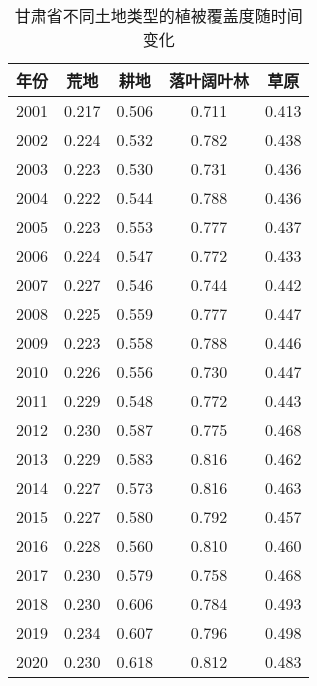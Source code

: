 \documentclass{article}
\begin{document}
		\begin{table}[H]
			\centering
			\begin{tabular}{|c|c|c|c|c|}
				\hline
				\textbf{年份} & \textbf{荒地} & \textbf{耕地} & \textbf{落叶阔叶林} & \textbf{草原} \\
				\hline
				2001 & 0.217 & 0.506 & 0.711 & 0.413 \\
				2002 & 0.224 & 0.532 & 0.782 & 0.438 \\
				2003 & 0.223 & 0.530 & 0.731 & 0.436 \\
				2004 & 0.222 & 0.544 & 0.788 & 0.436 \\
				2005 & 0.223 & 0.553 & 0.777 & 0.437 \\
				2006 & 0.224 & 0.547 & 0.772 & 0.433 \\
				2007 & 0.227 & 0.546 & 0.744 & 0.442 \\
				2008 & 0.225 & 0.559 & 0.777 & 0.447 \\
				2009 & 0.223 & 0.558 & 0.788 & 0.446 \\
				2010 & 0.226 & 0.556 & 0.730 & 0.447 \\
				2011 & 0.229 & 0.548 & 0.772 & 0.443 \\
				2012 & 0.230 & 0.587 & 0.775 & 0.468 \\
				2013 & 0.229 & 0.583 & 0.816 & 0.462 \\
				2014 & 0.227 & 0.573 & 0.816 & 0.463 \\
				2015 & 0.227 & 0.580 & 0.792 & 0.457 \\
				2016 & 0.228 & 0.560 & 0.810 & 0.460 \\
				2017 & 0.230 & 0.579 & 0.758 & 0.468 \\
				2018 & 0.230 & 0.606 & 0.784 & 0.493 \\
				2019 & 0.234 & 0.607 & 0.796 & 0.498 \\
				2020 & 0.230 & 0.618 & 0.812 & 0.483 \\
				\hline
			\end{tabular}
			\caption{甘肃省不同土地类型的植被覆盖度随时间变化}
		\end{table}
\end{document}
